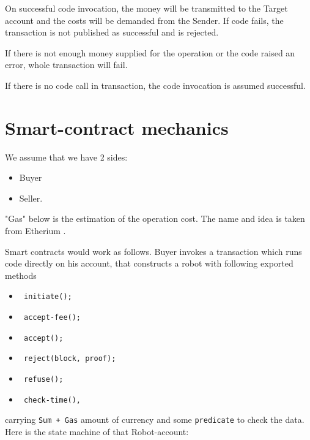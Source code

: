 \documentclass[a4paper]{article}
\begin{document}
On successful code invocation, the money will be transmitted to the Target account and the costs will be demanded from the Sender.
If code fails, the transaction is not published as successful and is rejected.

If there is not enough money supplied for the operation or the code raised an error, whole transaction will fail.

If there is no code call in transaction, the code invocation is assumed successful.

\section*{Smart-contract mechanics}

We assume that we have 2 sides:
\begin{itemize}
  \item Buyer
  \item Seller.
\end{itemize}

"Gas" below is the estimation of the operation cost. The name and idea is taken from Etherium \cite{eth}.

Smart contracts would work as follows. Buyer invokes a transaction which runs code directly on his account, that constructs a robot with following exported methods

\begin{itemize}
  \item \begin{verbatim} initiate(); \end{verbatim}
  \item \begin{verbatim} accept-fee(); \end{verbatim}
  \item \begin{verbatim} accept(); \end{verbatim}
  \item \begin{verbatim} reject(block, proof); \end{verbatim}
  \item \begin{verbatim} refuse(); \end{verbatim}
  \item \begin{verbatim} check-time(), \end{verbatim}
\end{itemize}
carrying \verb|Sum + Gas| amount of currency and some \verb|predicate| to check the data.
\newline
\newline
Here is the state machine of that Robot-account:
\end{document}
